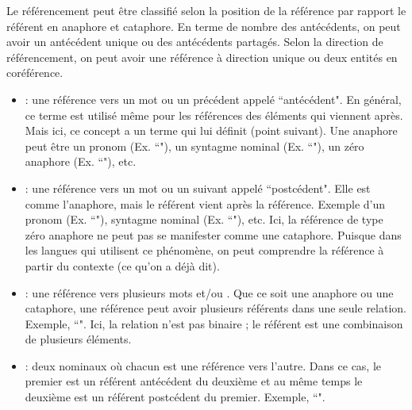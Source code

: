 \documentclass{KodeBook}
\begin{document}
Le référencement peut être classifié selon la position de la référence par rapport le référent en anaphore et cataphore. 
En terme de nombre des antécédents, on peut avoir un antécédent unique ou des antécédents partagés. 
Selon la direction de référencement, on peut avoir une référence à direction unique ou deux entités en coréférence.

\begin{itemize}
	\item {} : une référence vers un mot ou un  précédent appelé ``antécédent".
	En général, ce terme est utilisé même pour les références des éléments qui viennent après. 
	Mais ici, ce concept a un terme qui lui définit (point suivant).
	Une anaphore peut être un pronom (Ex. ``"), un syntagme nominal (Ex. ``"), un zéro anaphore (Ex. ``"), etc.
	
	\item {} : une référence vers un mot ou un  suivant appelé ``postcédent".
	Elle est comme l'anaphore, mais le référent vient après la référence. 
	Exemple d'un pronom (Ex. ``"), syntagme nominal (Ex. ``"), etc. 
	Ici, la référence de type zéro anaphore ne peut pas se manifester comme une cataphore. 
	Puisque dans les langues qui utilisent ce phénomène, on peut comprendre la référence à partir du contexte (ce qu'on a déjà dit).
	
	\item {} : une référence vers plusieurs mots et/ou .
	Que ce soit une anaphore ou une cataphore, une référence peut avoir plusieurs référents dans une seule relation.
	Exemple, ``".
	Ici, la relation n'est pas binaire ; le référent est une combinaison de plusieurs éléments. 
	
	\item {} : deux  nominaux où chacun est une référence vers l'autre. 
	Dans ce cas, le premier est un référent antécédent du deuxième et au même temps le deuxième est un référent postcédent du premier.  
	Exemple, ``".
	
\end{itemize}
\end{document}
